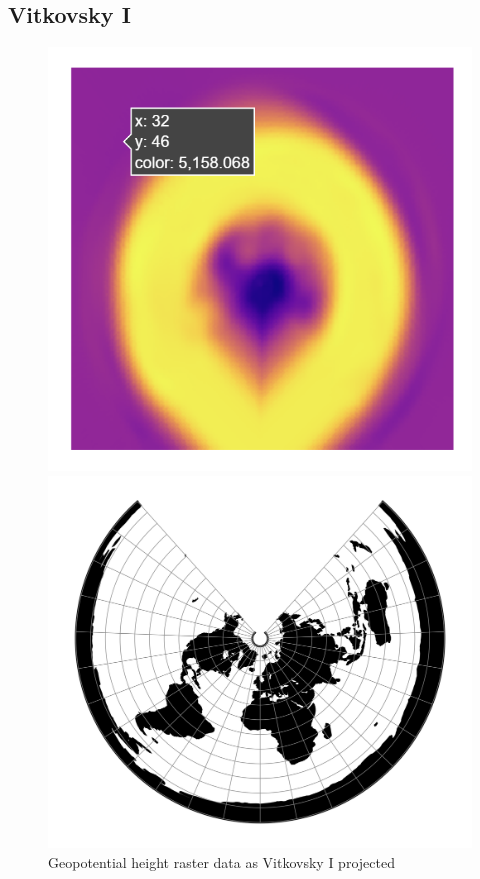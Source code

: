 \subsection{Vitkovsky I}
\begin{figure}[h]
    \centering
    \begin{minipage}{0.30\textwidth}
        \centering
        \includegraphics[width=0.9\linewidth]{figures/chapter-8/geopoth_vitk.png}
        \caption{ Geopotential height raster data as Vitkovsky I projected}
        \label{fig:vitk_geopoth_raster}
    \end{minipage}\hfill
    \begin{minipage}{0.30\textwidth}
        \centering
        \includegraphics[width=0.9\linewidth]{figures/chapter-8/vitk1.png}

\end{minipage}
\end{figure}
